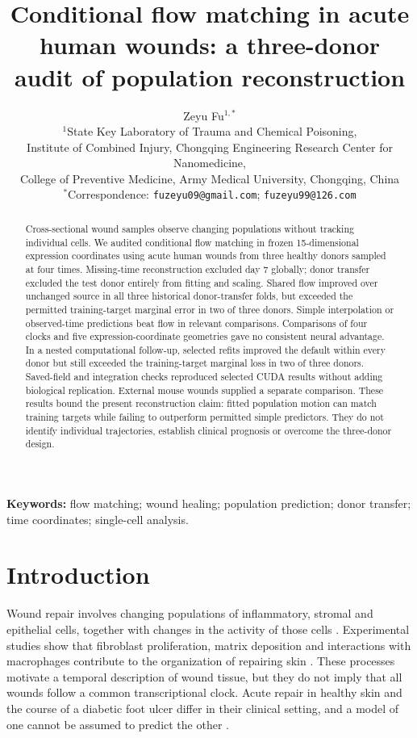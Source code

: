 \documentclass[10pt,a4paper]{article}
\title{Conditional flow matching in acute human wounds: a three-donor audit of population reconstruction}
\author{Zeyu Fu$^{1,*}$\\[3pt]\small $^1$State Key Laboratory of Trauma and Chemical Poisoning,\\\small Institute of Combined Injury, Chongqing Engineering Research Center for Nanomedicine,\\\small College of Preventive Medicine, Army Medical University, Chongqing, China\\\small $^*$Correspondence: \texttt{fuzeyu09@gmail.com}; \texttt{fuzeyu99@126.com}}\date{}
\begin{document}
\maketitle
\begin{abstract}
Cross-sectional wound samples observe changing populations without tracking individual cells. We audited conditional flow matching in frozen 15-dimensional expression coordinates using acute human wounds from three healthy donors sampled at four times. Missing-time reconstruction excluded day 7 globally; donor transfer excluded the test donor entirely from fitting and scaling. Shared flow improved over unchanged source in all three historical donor-transfer folds, but exceeded the permitted training-target marginal error in two of three donors. Simple interpolation or observed-time predictions beat flow in relevant comparisons. Comparisons of four clocks and five expression-coordinate geometries gave no consistent neural advantage. In a nested computational follow-up, selected refits improved the default within every donor but still exceeded the training-target marginal loss in two of three donors. Saved-field and integration checks reproduced selected CUDA results without adding biological replication. External mouse wounds supplied a separate comparison. These results bound the present reconstruction claim: fitted population motion can match training targets while failing to outperform permitted simple predictors. They do not identify individual trajectories, establish clinical prognosis or overcome the three-donor design.
\end{abstract}
\noindent\textbf{Keywords:} flow matching; wound healing; population prediction; donor transfer; time coordinates; single-cell analysis.

\section{Introduction}
Wound repair involves changing populations of inflammatory, stromal and epithelial cells, together with changes in the activity of those cells \citep{wilkinson2020}. Experimental studies show that fibroblast proliferation, matrix deposition and interactions with macrophages contribute to the organization of repairing skin \citep{rognoni2018,shook2018}. These processes motivate a temporal description of wound tissue, but they do not imply that all wounds follow a common transcriptional clock. Acute repair in healthy skin and the course of a diabetic foot ulcer differ in their clinical setting, and a model of one cannot be assumed to predict the other \citep{armstrong2017}.
\end{document}
